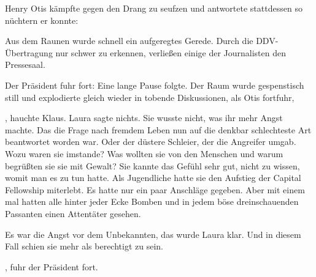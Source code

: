 \par

Henry Otis kämpfte gegen den Drang zu seufzen und antwortete stattdessen so nüchtern er konnte: 

\par

Aus dem Raunen wurde schnell ein aufgeregtes Gerede. Durch die DDV-Übertragung nur schwer zu erkennen, verließen einige der Journalisten den Pressesaal.

\par

Der Präsident fuhr fort:  Eine lange Pause folgte. Der Raum wurde gespenstisch still und explodierte gleich wieder in tobende Diskussionen, als Otis fortfuhr, 

\par

, hauchte Klaus. Laura sagte nichts. Sie wusste nicht, was ihr mehr Angst machte. Das die Frage nach fremdem Leben nun auf die denkbar schlechteste Art beantwortet worden war. Oder der düstere Schleier, der die Angreifer umgab. Wozu waren sie imstande? Was wollten sie von den Menschen und warum begrüßten sie sie mit Gewalt? Sie kannte das Gefühl sehr gut, nicht zu wissen, womit man es zu tun hatte. Als Jugendliche hatte sie den Aufstieg der Capital Fellowship miterlebt. Es hatte nur ein paar Anschläge gegeben. Aber mit einem mal hatten alle hinter jeder Ecke Bomben und in jedem böse dreinschauenden Passanten einen Attentäter gesehen.

\par

Es war die Angst vor dem Unbekannten, das wurde Laura klar. Und in diesem Fall schien sie mehr als berechtigt zu sein.

\par

, fuhr der Präsident fort. 

